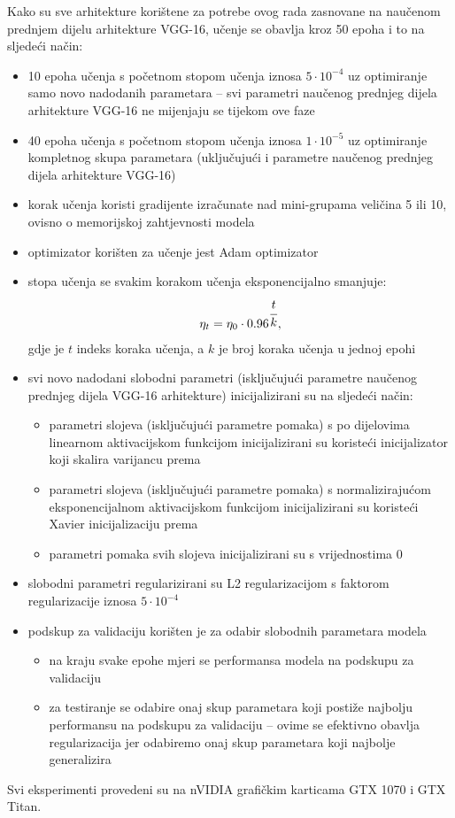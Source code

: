 \documentclass[times, utf8, diplomski, numeric]{fer}
\begin{document}
Kako su sve arhitekture korištene za potrebe ovog rada zasnovane na naučenom prednjem dijelu arhitekture VGG-16, učenje se obavlja kroz 50 epoha i to na sljedeći način:
\begin{itemize}
 \item 10 epoha učenja s početnom stopom učenja iznosa $5\cdot10^{-4}$ uz optimiranje samo novo nadodanih parametara -- svi parametri naučenog prednjeg dijela arhitekture VGG-16 ne mijenjaju se tijekom ove faze
 \item 40 epoha učenja s početnom stopom učenja iznosa $1\cdot10^{-5}$ uz optimiranje kompletnog skupa parametara (uključujući i parametre naučenog prednjeg dijela arhitekture VGG-16)
 \item korak učenja koristi gradijente izračunate nad mini-grupama veličina 5 ili 10, ovisno o memorijskoj zahtjevnosti modela
 \item optimizator korišten za učenje jest Adam optimizator
 \item stopa učenja se svakim korakom učenja eksponencijalno smanjuje:
 \begin{align}
  \eta_{t}=\eta_0 \cdot 0.96^{\cfrac{t}{k}},
 \end{align}
gdje je $t$ indeks koraka učenja, a $k$ je broj koraka učenja u jednoj epohi
 \item svi novo nadodani slobodni parametri (isključujući parametre naučenog prednjeg dijela VGG-16 arhitekture) inicijalizirani su na sljedeći način:
 \begin{itemize}
  \item parametri slojeva (isključujući parametre pomaka) s po dijelovima linearnom aktivacijskom funkcijom inicijalizirani su koristeći inicijalizator koji skalira varijancu prema \citep{article:delving_deep_into_rectifiers}
  \item parametri slojeva (isključujući parametre pomaka) s normalizirajućom eksponencijalnom aktivacijskom funkcijom inicijalizirani su koristeći Xavier inicijalizaciju prema \citep{article:delving_deep_into_rectifiers}
  \item parametri pomaka svih slojeva inicijalizirani su s vrijednostima 0
 \end{itemize}

 \item slobodni parametri regularizirani su L2 regularizacijom s faktorom regularizacije iznosa $5\cdot10^{-4}$
 \item podskup za validaciju korišten je za odabir slobodnih parametara modela
 \begin{itemize}
  \item na kraju svake epohe mjeri se performansa modela na podskupu za validaciju
  \item za testiranje se odabire onaj skup parametara koji postiže najbolju performansu na podskupu za validaciju -- ovime se efektivno obavlja regularizacija jer odabiremo onaj skup parametara koji najbolje generalizira
 \end{itemize}
\end{itemize}
Svi eksperimenti provedeni su na nVIDIA grafičkim karticama GTX 1070 i GTX Titan.
\end{document}
